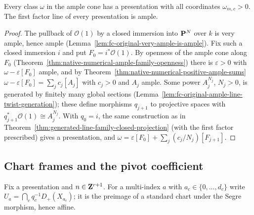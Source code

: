 \begin{lemma}
\label{lem:pm-exists-positive-presentation}
\leanok
{}
Every class $\omega$ in the ample cone has a presentation with all coordinates $\omega_{m,c}>0$.
The first factor line of every presentation is ample.
\end{lemma}
\begin{proof}
\leanok
The pullback of $\mathcal O(1)$ by a closed immersion into $\mathbf{P}^N$ over $k$ is very ample, hence
ample (Lemma~\ref{lem:fc-original-very-ample-is-ample}). Fix such a closed immersion $i$ and
put $F_0=i^*\mathcal O(1)$. By openness of the ample cone along $F_0$
(Theorem~\ref{thm:native-numerical-ample-family-openness}) there is $\varepsilon>0$ with
$\omega-\varepsilon[F_0]$ ample, and by Theorem~\ref{thm:native-numerical-positive-ample-sums}
$\omega-\varepsilon[F_0]=\sum_jc_j[A_j]$ with $c_j>0$ and $A_j$ ample. Some power $A_j^{N_j}$,
$N_j>0$, is generated by finitely many global sections
(Lemma~\ref{lem:fc-original-ample-line-twist-generation}); these define morphisms $q_{j+1}$ to
projective spaces with $q_{j+1}^*\mathcal O(1)\cong A_j^{N_j}$. With $q_0=i$, the same
construction as in Theorem~\ref{thm:generated-line-family-closed-projection} (with the first
factor prescribed) gives a presentation, and
$\omega=\varepsilon[F_0]+\sum_j(c_j/N_j)[F_{j+1}]$.
\end{proof}

\subsection{Chart frames and the pivot coefficient}

Fix a presentation and $n\in\mathbf{Z}^{r+1}$. For a multi-index $a$ with $a_c\in\{0,\dots,d_c\}$ write
$U_a=\bigcap_cq_c^{-1}D_+(X_{a_c})$; it is the preimage of a standard chart under the Segre
morphism, hence affine.

